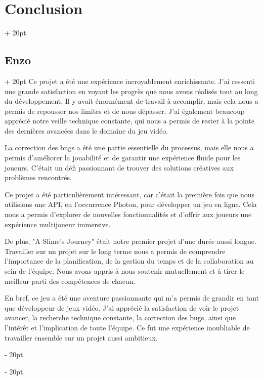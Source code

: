 \documentclass[a4paper, 12pt, twoside]{article}
\newcommand{\ind}[1][20pt]{\advance\leftskip + #1}
\newcommand{\deind}[1][20pt]{\advance\leftskip - #1}
\newenvironment{indt}[2][20pt]{#2 \par \ind[#1]}{\par \deind} %
\begin{document}
\begin{indt}{\section{Conclusion}}
        \begin{indt}{\subsection{Enzo}}
            Ce projet a été une expérience incroyablement enrichissante. J'ai ressenti une grande satisfaction en voyant les progrès que nous avons réalisés tout au long du développement. Il y avait énormément de travail à accomplir, mais cela nous a permis de repousser nos limites et de nous dépasser. J'ai également beaucoup apprécié notre veille technique constante, qui nous a permis de rester à la pointe des dernières avancées dans le domaine du jeu vidéo.

            La correction des bugs a été une partie essentielle du processus, mais elle nous a permis d'améliorer la jouabilité et de garantir une expérience fluide pour les joueurs. C'était un défi passionnant de trouver des solutions créatives aux problèmes rencontrés.

            Ce projet a été particulièrement intéressant, car c'était la première fois que nous utilisions une API, en l'occurrence Photon, pour développer un jeu en ligne. Cela nous a permis d'explorer de nouvelles fonctionnalités et d'offrir aux joueurs une expérience multijoueur immersive.

            De plus, "A Slime's Journey" était notre premier projet d'une durée aussi longue. Travailler sur un projet sur le long terme nous a permis de comprendre l'importance de la planification, de la gestion du temps et de la collaboration au sein de l'équipe. Nous avons appris à nous soutenir mutuellement et à tirer le meilleur parti des compétences de chacun.

            En bref, ce jeu a été une aventure passionnante qui m'a permis de grandir en tant que développeur de jeux vidéo. J'ai apprécié la satisfaction de voir le projet avancer, la recherche technique constante, la correction des bugs, ainsi que l'intérêt et l'implication de toute l'équipe. Ce fut une expérience inoubliable de travailler ensemble sur un projet aussi ambitieux.

        \end{indt}


\end{indt}
\end{document}
